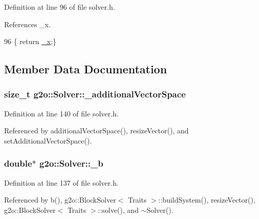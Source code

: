 Definition at line 96 of file solver.\+h.



References \+\_\+x.


\begin{DoxyCode}
96 \{ \textcolor{keywordflow}{return} \hyperlink{classg2o_1_1Solver_a94ee5e303a754f4ff338a7b032c214ae}{\_x};\}
\end{DoxyCode}


\subsection{Member Data Documentation}
\subsubsection[{\texorpdfstring{\+\_\+additional\+Vector\+Space}{_additionalVectorSpace}}]{\setlength{\rightskip}{0pt plus 5cm}size\+\_\+t g2o\+::\+Solver\+::\+\_\+additional\+Vector\+Space\hspace{0.3cm}{\ttfamily [protected]}}\hypertarget{classg2o_1_1Solver_a6a1492959487c279747a8f3097a5f04e}{}\label{classg2o_1_1Solver_a6a1492959487c279747a8f3097a5f04e}


Definition at line 140 of file solver.\+h.



Referenced by additional\+Vector\+Space(), resize\+Vector(), and set\+Additional\+Vector\+Space().

\subsubsection[{\texorpdfstring{\+\_\+b}{_b}}]{\setlength{\rightskip}{0pt plus 5cm}double$\ast$ g2o\+::\+Solver\+::\+\_\+b\hspace{0.3cm}{\ttfamily [protected]}}\hypertarget{classg2o_1_1Solver_a52c92c9bf5db0da3322da3a02dbeb245}{}\label{classg2o_1_1Solver_a52c92c9bf5db0da3322da3a02dbeb245}


Definition at line 137 of file solver.\+h.



Referenced by b(), g2o\+::\+Block\+Solver$<$ Traits $>$\+::build\+System(), resize\+Vector(), g2o\+::\+Block\+Solver$<$ Traits $>$\+::solve(), and $\sim$\+Solver().

